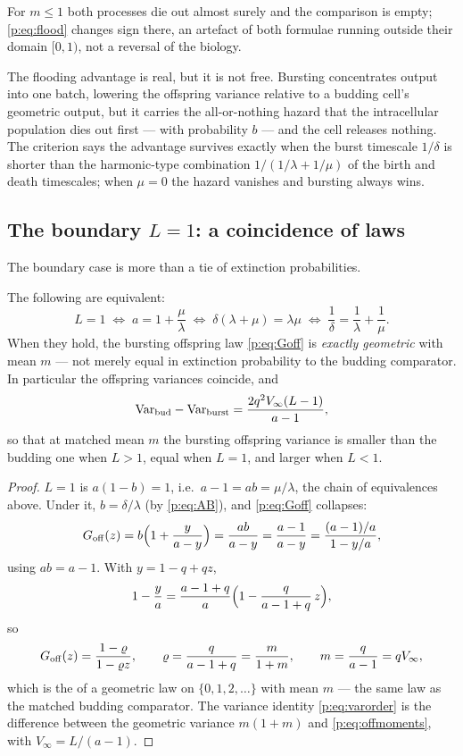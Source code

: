 For $m\le1$ both processes die out almost surely and the comparison is
empty; \cref{p:eq:flood} changes sign there, an artefact of both formulae
running outside their domain $[0,1)$, not a reversal of the biology.

The flooding advantage is real, but it is not free. Bursting
concentrates output into one batch, lowering the offspring variance relative
to a budding cell's geometric output, but it carries the all-or-nothing
hazard that the intracellular population dies out first --- with probability
$b$ --- and the cell releases nothing. The criterion says the advantage
survives exactly when the burst timescale $1/\delta$ is shorter than the
harmonic-type combination $1/(1/\lambda+1/\mu)$ of the birth and death
timescales; when $\mu=0$ the hazard vanishes and bursting always wins.

\subsection{The boundary \texorpdfstring{$L=1$}{L=1}: a coincidence of laws}

The boundary case is more than a tie of extinction probabilities.

\begin{proposition}
\label{p:prop:L1}
The following are equivalent:
\begin{equation}
L=1
\;\Longleftrightarrow\;
a=1+\frac{\mu}{\lambda}
\;\Longleftrightarrow\;
\delta(\lambda+\mu)=\lambda\mu
\;\Longleftrightarrow\;
\frac{1}{\delta}=\frac{1}{\lambda}+\frac{1}{\mu}.
\label{p:eq:L1equiv}
\end{equation}
When they hold, the bursting offspring law \cref{p:eq:Goff} is
\emph{exactly geometric} with mean $m$ --- not merely equal in extinction
probability to the budding comparator. In particular the offspring variances
coincide, and
\begin{equation}
\mathrm{Var}_{\rm bud}-\mathrm{Var}_{\rm burst}
=\frac{2q^2V_\infty(L-1)}{a-1},
\label{p:eq:varorder}
\end{equation}
so that at matched mean $m$ the bursting offspring variance is smaller than
the budding one when $L>1$, equal when $L=1$, and larger when $L<1$.
\end{proposition}

\begin{proof}
$L=1$ is $a(1-b)=1$, i.e.\ $a-1=ab=\mu/\lambda$, the chain of equivalences
above. Under it, $b=\delta/\lambda$ (by \cref{p:eq:AB}), and
\cref{p:eq:Goff} collapses:
\[
G_{\rm off}(z)=b\Bigl(1+\frac{y}{a-y}\Bigr)=\frac{ab}{a-y}
=\frac{a-1}{a-y}
=\frac{(a-1)/a}{1-y/a},
\]
using $ab=a-1$. With $y=1-q+qz$,
\[
1-\frac{y}{a}=\frac{a-1+q}{a}\Bigl(1-\frac{q}{a-1+q}\,z\Bigr),
\]
so
\[
G_{\rm off}(z)=\frac{1-\varrho}{1-\varrho z},
\qquad
\varrho=\frac{q}{a-1+q}=\frac{m}{1+m},
\qquad m=\frac{q}{a-1}=qV_\infty,
\]
which is the \pgf{} of a geometric law on $\{0,1,2,\ldots\}$ with mean $m$
--- the same law as the matched budding comparator. The variance identity
\cref{p:eq:varorder} is the difference between the geometric variance
$m(1+m)$ and \cref{p:eq:offmoments}, with $V_\infty=L/(a-1)$.
\end{proof}

